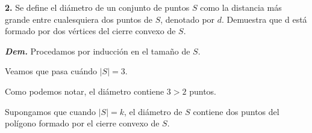 \textbf{2.} Se define el diámetro de un conjunto de puntos $S$ como la distancia más grande
entre cualesquiera dos puntos de $S$, denotado por $d$. Demuestra que d está formado por dos
vértices del cierre convexo de $S$. \newline

\textbf{\textit{Dem.}} Procedamos por inducción en el tamaño de $S$. \newline

Veamos que pasa cuándo $|S| = 3$.
\begin{figure}[ht!]
  \centering
\end{figure}
Como podemos notar, el diámetro contiene $3 > 2$ puntos.
\newline

Supongamos que cuando $|S| = k$, el diámetro de $S$ contiene dos puntos del polígono formado
por el cierre convexo de $S$.
\newline

